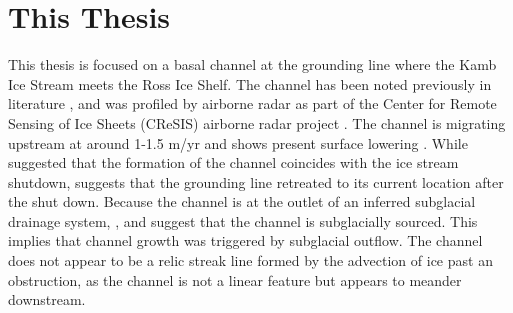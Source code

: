 \section{This Thesis}

This thesis is focused on a basal channel at the grounding line where the Kamb Ice Stream meets the Ross Ice Shelf. The channel has been noted previously in literature \citep{le2009subglacial,alley2016impacts,kim2016active,goeller2015subglacial,horgan2017poststagnation}, and was profiled by airborne radar as part of the Center for Remote Sensing of Ice Sheets (CReSIS) airborne radar project \citep{arnold2020cresis}. The channel is migrating upstream at around 1-1.5 m/yr and shows present surface lowering \citep{kim2016active}. While \cite{kim2016active} suggested that the formation of the channel coincides with the ice stream shutdown,   \cite{horgan2017poststagnation} suggests that the grounding line retreated to its current location after the shut down. Because the channel is at the outlet of an inferred subglacial drainage system, \cite{le2009subglacial}, \cite{alley2016impacts} and \cite{kim2016active} suggest that the channel is subglacially sourced. This implies that channel growth was triggered by subglacial outflow. The channel does not appear to be a relic streak line formed by the advection of ice past an obstruction, as the channel is not a linear feature but appears to meander downstream.



